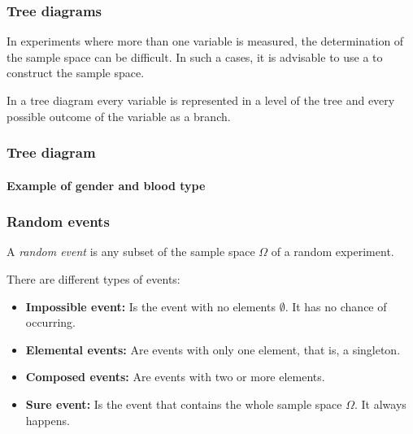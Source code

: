 \begin{frame}
\frametitle{Tree diagrams}
In experiments where more than one variable is measured, the determination of the sample space can be difficult. 
In such a cases, it is advisable to use a  to construct the sample space. 

In a tree diagram every variable is represented in a level of the tree and every possible outcome of the variable as a
branch.
\end{frame}


\begin{frame}
\frametitle{Tree diagram}
\framesubtitle{Example of gender and blood type}

\begin{center}
\end{center}
\end{frame}


\begin{frame}
\frametitle{Random events}
\begin{definition}
A \emph{random event} is any subset of the sample space $\Omega$ of a random experiment.
\end{definition}

There are different types of events:
\begin{itemize}
\item \textbf{Impossible event:} Is the event with no elements $\emptyset$. It has no chance of occurring.
\item \textbf{Elemental events:} Are events with only one element, that is, a singleton.
\item \textbf{Composed events:} Are events with two or more elements.
\item \textbf{Sure event:} Is the event that contains the whole sample space $\Omega$. It always happens.
\end{itemize}
\end{frame}


